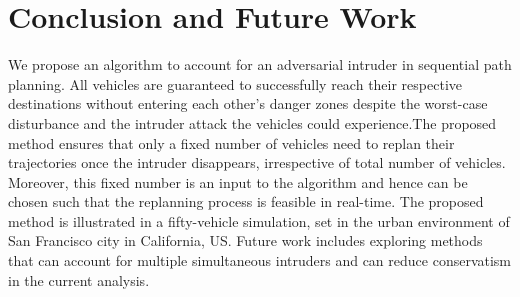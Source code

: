 \section{Conclusion and Future Work}
We propose an algorithm to account for an adversarial intruder in sequential path planning. All vehicles are guaranteed to successfully reach their respective destinations without entering each other's danger zones despite the worst-case disturbance and the intruder attack the vehicles could experience.The proposed method ensures that only a fixed number of vehicles need to replan their trajectories once the intruder disappears, irrespective of total number of vehicles. Moreover, this fixed number is an input to the algorithm and hence can be chosen such that the replanning process is feasible in real-time. The proposed method is illustrated in a fifty-vehicle simulation, set in the urban environment of San Francisco city in California, US. Future work includes exploring methods that can account for multiple simultaneous intruders and can reduce conservatism in the current analysis.